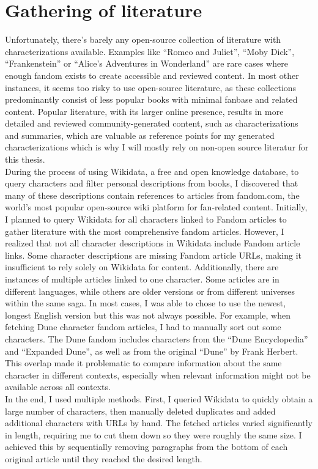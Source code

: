 
\chapter{Gathering of literature}
Unfortunately, there's barely any open-source collection of literature with 
characterizations available. Examples like ``Romeo and Juliet'', ``Moby Dick'', ``Frankenstein'' or ``Alice's Adventures in Wonderland'' are rare cases where enough fandom exists to create accessible and reviewed content. In most other instances, it seems too risky to use open-source literature, as these collections predominantly consist of less popular books with minimal fanbase and related content. Popular literature, with its larger online presence, results in more detailed and reviewed community-generated content, such as characterizations and summaries, which are valuable as reference points for my generated characterizations which is why I will mostly rely on non-open source literatur for this thesis.\\

During the process of using Wikidata, a free and open knowledge database, to query characters and filter personal descriptions from books, I discovered that many of these descriptions contain references to articles from fandom.com, the world's most popular open-source wiki platform for fan-related content. Initially, I planned to query Wikidata for all characters linked to Fandom articles to gather literature with the most comprehensive fandom articles. However, I realized that not all character descriptions in Wikidata include Fandom article links. Some character descriptions are missing Fandom article URLs, making it insufficient to rely solely on Wikidata for content. Additionally, there are instances of multiple articles linked to one character. Some articles are in different languages, while others are older versions or from different universes within the same saga. In most cases, I was able to chose to use the newest, longest English version but this was not always possible. For example, when fetching Dune character fandom articles, I had to manually sort out some characters. The Dune fandom includes characters from the ``Dune Encyclopedia'' and ``Expanded Dune'', as well as from the original ``Dune'' by Frank Herbert. This overlap made it problematic to compare information about the same character in different contexts, especially when relevant information might not be available across all contexts.\\

In the end, I used multiple methods. First, I queried Wikidata to quickly obtain a large number of characters, then manually deleted duplicates and added additional characters with URLs by hand. The fetched articles varied significantly in length, requiring me to cut them down so they were roughly the same size. I achieved this by sequentially removing paragraphs from the bottom of each original article until they reached the desired length.

